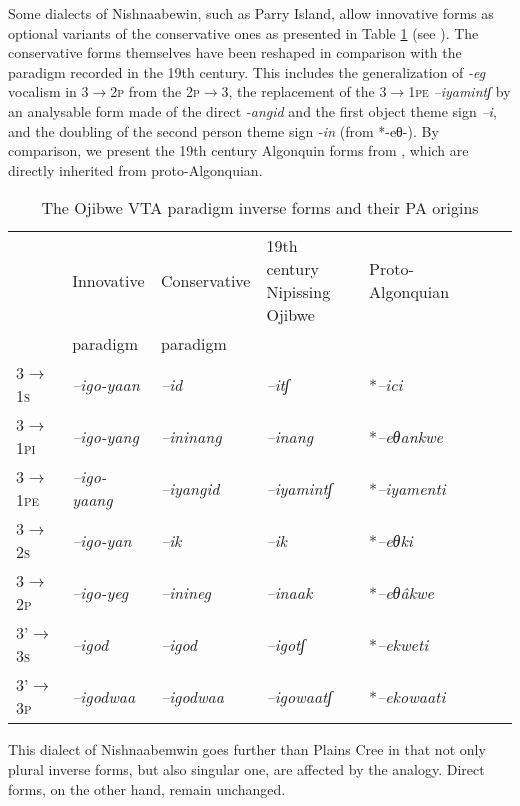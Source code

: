 \documentclass[twoside,a4paper,11pt]{article}
\newcommand{\ipa}[1]{{\phon\textit{#1}}}
\newcommand{\grise}[1]{\cellcolor{lightgray}\textbf{#1}}
\newcommand{\Σ}{\greek{Σ}}
\begin{document}
Some dialects of Nishnaabewin,  such as Parry Island, allow innovative forms as optional variants of the conservative ones as presented in Table \ref{tab:ojibwe.vta.2} (see \citealt[178-9]{valentine01grammar}). The conservative forms themselves have been reshaped in comparison with the paradigm recorded in the 19th century. This includes the generalization of \ipa{-eg} vocalism in \textsc{3$\rightarrow$2p}  from the \textsc{2p$\rightarrow$3}, the replacement of the \textsc{3$\rightarrow$1pe}  \ipa{--iyamintʃ}  by an analysable form made of the direct \ipa{-angid} and the first object theme sign \ipa{--i}, and the doubling of the second person theme sign \ipa{-in} (from *-eθ-). By comparison, we present the 19th century Algonquin forms from \citet[51]{cuoq1866}, which are directly inherited from proto-Algonquian.

\begin{table}[H]
\caption{The Ojibwe VTA paradigm inverse forms and their PA origins}
\centering \label{tab:ojibwe.vta.2}
\begin{tabular}{llllllll}
\toprule
& Innovative & Conservative & 19th century Nipissing Ojibwe & Proto-Algonquian \\
&paradigm & paradigm&\\
\midrule
\textsc{3$\rightarrow$1s} &\ipa{--igo-yaan} \grise{}& 	\ipa{--id} & \ipa{--itʃ} &	 *\ipa{--ici} & 		\\
\textsc{3$\rightarrow$1pi} & 	\ipa{--igo-yang} \grise{}& 	\ipa{--ininang}  \grise{} &  	\ipa{--inang}  	 &*\ipa{--eθankwe} & 		\\
\textsc{3$\rightarrow$1pe} & 	\ipa{--igo-yaang} \grise{}& 	\ipa{--iyangid} \grise{}&	\ipa{--iyamintʃ}  &  *\ipa{--iyamenti} & 		\\
\midrule
\textsc{3$\rightarrow$2s} & 	\ipa{--igo-yan} \grise{}& 	\ipa{--ik} &	\ipa{--ik} &  *\ipa{--eθki} & 		\\
\textsc{3$\rightarrow$2p} & \ipa{--igo-yeg} \grise{}& 	\ipa{--inineg}  \grise{} & \ipa{--inaak}  & *\ipa{--eθâkwe} & 		\\
\midrule
3'\textsc{$\rightarrow$3s} & \ipa{--igod} & 	\ipa{--igod} &		\ipa{--igotʃ} &*\ipa{--ekweti} & 		\\
3'\textsc{$\rightarrow$3p} & \ipa{--igodwaa}   & 	\ipa{--igodwaa}  \grise{}&\ipa{--igowaatʃ} &*\ipa{--ekowaati} & 		\\
\bottomrule
\end{tabular}
\end{table}

This dialect of Nishnaabemwin goes further than Plains Cree in that not only plural inverse forms, but also singular one, are affected by the analogy. Direct forms, on the other hand, remain unchanged.
\end{document}
